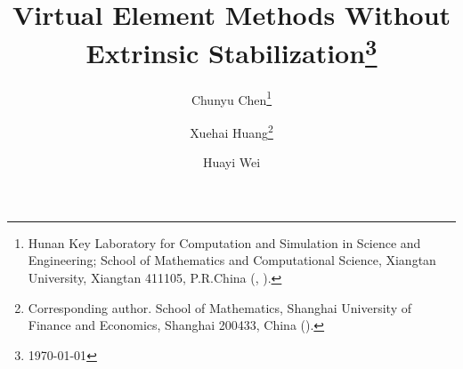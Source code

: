 
\title{Virtual Element Methods Without Extrinsic Stabilization\thanks{\today
{}}}


\author{Chunyu Chen\thanks{Hunan Key Laboratory for Computation and Simulation in Science and Engineering; School of Mathematics and Computational Science, Xiangtan University, Xiangtan 411105, P.R.China 
  (, ).}
\and Xuehai Huang\thanks{Corresponding author. School of Mathematics, Shanghai University of Finance and Economics, Shanghai 200433, China ().}
\and Huayi Wei\footnotemark[2]
}


\usepackage{amsopn}
\DeclareMathOperator{\diag}{diag}


